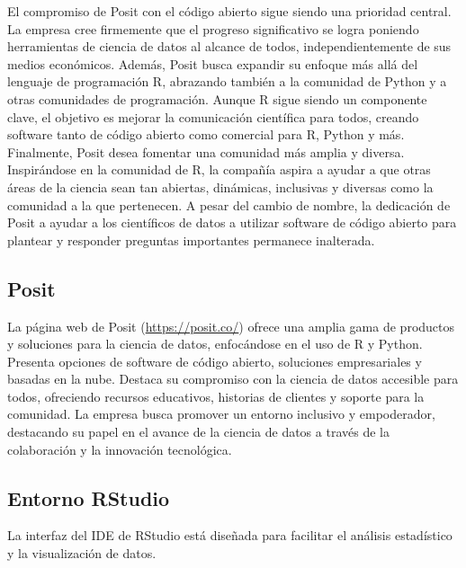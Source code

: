 \documentclass[12pt]{report}\usepackage[]{graphicx}\usepackage[dvipsnames]{xcolor}
\begin{document}
	El compromiso de Posit con el código abierto sigue siendo una prioridad central. La empresa cree firmemente que el progreso significativo se logra poniendo herramientas de ciencia de datos al alcance de todos, independientemente de sus medios económicos. Además, Posit busca expandir su enfoque más allá del lenguaje de programación R, abrazando también a la comunidad de Python y a otras comunidades de programación. Aunque R sigue siendo un componente clave, el objetivo es mejorar la comunicación científica para todos, creando software tanto de código abierto como comercial para R, Python y más.\\
	
	Finalmente, Posit desea fomentar una comunidad más amplia y diversa. Inspirándose en la comunidad de R, la compañía aspira a ayudar a que otras áreas de la ciencia sean tan abiertas, dinámicas, inclusivas y diversas como la comunidad a la que pertenecen. A pesar del cambio de nombre, la dedicación de Posit a ayudar a los científicos de datos a utilizar software de código abierto para plantear y responder preguntas importantes permanece inalterada.
	
	\subsection*{Posit}
	
	La página web de Posit (\url{https://posit.co/}) ofrece una amplia gama de productos y soluciones para la ciencia de datos, enfocándose en el uso de R y Python. Presenta opciones de software de código abierto, soluciones empresariales y basadas en la nube. Destaca su compromiso con la ciencia de datos accesible para todos, ofreciendo recursos educativos, historias de clientes y soporte para la comunidad. La empresa busca promover un entorno inclusivo y empoderador, destacando su papel en el avance de la ciencia de datos a través de la colaboración y la innovación tecnológica.
	
	\subsection*{Entorno RStudio}
	
	La interfaz del IDE de RStudio está diseñada para facilitar el análisis estadístico y la visualización de datos.
	
\end{document}
